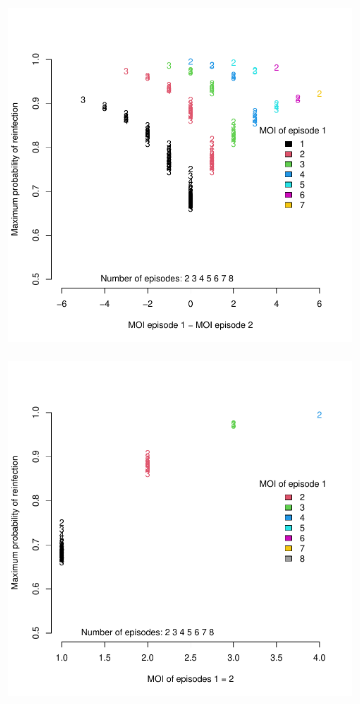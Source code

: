 \documentclass{article}
\begin{document}
\begin{figure}[h]
\begin{subfigure}{.5\textwidth}
  \centering
  \includegraphics[width=0.9\linewidth]
  {figures/MOIDiff_reinfection.pdf}
  \caption{}
  \label{fig:MOIDiff_reinfection}
\end{subfigure}
\begin{subfigure}{.5\textwidth}
  \centering
  \includegraphics[width=0.9\linewidth]{figures/MOIEqual_reinfection.pdf}

\end{subfigure}
\end{figure}
\end{document}
